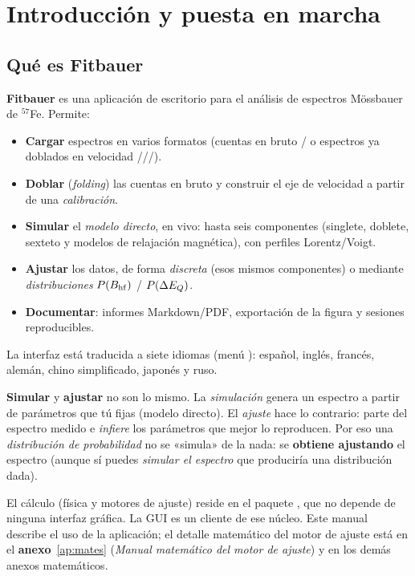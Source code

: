 \chapter{Introducción y puesta en marcha}
\label{ch:intro}

\section{Qué es Fitbauer}

\textbf{Fitbauer} es una aplicación de escritorio para el análisis de espectros
Mössbauer de $^{57}$Fe. Permite:

\begin{itemize}[nosep]
  \item \textbf{Cargar} espectros en varios formatos (cuentas en bruto
        / o espectros ya doblados en velocidad
        ///).
  \item \textbf{Doblar} (\emph{folding}) las cuentas en bruto y construir el eje
        de velocidad a partir de una \emph{calibración}.
  \item \textbf{Simular} el \emph{modelo directo}, en vivo: hasta seis componentes
        (singlete, doblete, sexteto y modelos de relajación magnética), con
        perfiles Lorentz/Voigt.
  \item \textbf{Ajustar} los datos, de forma \emph{discreta} (esos mismos
        componentes) o mediante \emph{distribuciones} $P(B_{\mathrm{hf}})$ / $P(\Delta E_{Q})$.
  \item \textbf{Documentar}: informes Markdown/PDF, exportación de la figura y
        sesiones reproducibles.
\end{itemize}

La interfaz está traducida a siete idiomas (menú ): español, inglés,
francés, alemán, chino simplificado, japonés y ruso.

\begin{nota}
\textbf{Simular} y \textbf{ajustar} no son lo mismo. La \emph{simulación} genera
un espectro a partir de parámetros que tú fijas (modelo directo). El \emph{ajuste}
hace lo contrario: parte del espectro medido e \emph{infiere} los parámetros que
mejor lo reproducen. Por eso una \emph{distribución de probabilidad} no se
«simula» de la nada: se \textbf{obtiene ajustando} el espectro (aunque sí puedes
\emph{simular el espectro} que produciría una distribución dada).
\end{nota}

\begin{nota}
El cálculo (física y motores de ajuste) reside en el paquete , que
no depende de ninguna interfaz gráfica. La GUI es un cliente de ese núcleo. Este
manual describe el uso de la aplicación; el detalle matemático del motor de
ajuste está en el \textbf{anexo}~\ref{ap:mates} (\emph{Manual matemático del
motor de ajuste}) y en los demás anexos matemáticos.
\end{nota}

